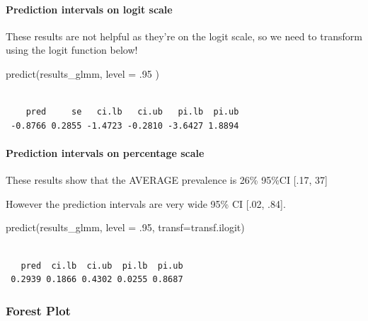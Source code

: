 \documentclass[
  letterpaper,
  DIV=11,
  numbers=noendperiod]{scrartcl}
\let\oldparagraph\paragraph
\renewcommand{\paragraph}[1]{\oldparagraph{#1}\mbox{}}
\newenvironment{Shaded}{\begin{snugshade}}{\end{snugshade}}
\newcommand{\AttributeTok}[1]{\textcolor[rgb]{0.40,0.45,0.13}{#1}}
\newcommand{\DecValTok}[1]{\textcolor[rgb]{0.68,0.00,0.00}{#1}}
\newcommand{\FunctionTok}[1]{\textcolor[rgb]{0.28,0.35,0.67}{#1}}
\newcommand{\NormalTok}[1]{\textcolor[rgb]{0.00,0.23,0.31}{#1}}
\begin{document}
\paragraph{Prediction intervals on logit
scale}\label{prediction-intervals-on-logit-scale}

These results are not helpful as they're on the logit scale, so we need
to transform using the logit function below!

\begin{Shaded}
\begin{Highlighting}[]
\FunctionTok{predict}\NormalTok{(results\_glmm,}
        \AttributeTok{level =}\NormalTok{ .}\DecValTok{95}
\NormalTok{        )}
\end{Highlighting}
\end{Shaded}

\begin{verbatim}

    pred     se   ci.lb   ci.ub   pi.lb  pi.ub 
 -0.8766 0.2855 -1.4723 -0.2810 -3.6427 1.8894 
\end{verbatim}

\paragraph{Prediction intervals on percentage
scale}\label{prediction-intervals-on-percentage-scale}

These results show that the AVERAGE prevalence is 26\% 95\%CI {[}.17,
37{]}

However the prediction intervals are very wide 95\% CI {[}.02, .84{]}.

\begin{Shaded}
\begin{Highlighting}[]
\FunctionTok{predict}\NormalTok{(results\_glmm, }
        \AttributeTok{level =}\NormalTok{ .}\DecValTok{95}\NormalTok{,}
        \AttributeTok{transf=}\NormalTok{transf.ilogit)}
\end{Highlighting}
\end{Shaded}

\begin{verbatim}

   pred  ci.lb  ci.ub  pi.lb  pi.ub 
 0.2939 0.1866 0.4302 0.0255 0.8687 
\end{verbatim}

\subsubsection{Forest Plot}\label{forest-plot}
\end{document}
